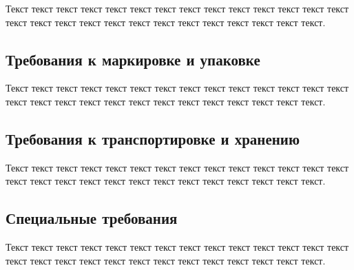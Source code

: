 Текст текст текст текст текст текст текст текст текст текст текст текст текст текст текст текст текст текст текст текст текст текст текст текст текст текст текст.

\subsection{Требования к маркировке и упаковке}

Текст текст текст текст текст текст текст текст текст текст текст текст текст текст текст текст текст текст текст текст текст текст текст текст текст текст текст.

\subsection{Требования к транспортировке и хранению}

Текст текст текст текст текст текст текст текст текст текст текст текст текст текст текст текст текст текст текст текст текст текст текст текст текст текст текст.

\subsection{Специальные требования}

Текст текст текст текст текст текст текст текст текст текст текст текст текст текст текст текст текст текст текст текст текст текст текст текст текст текст текст.
